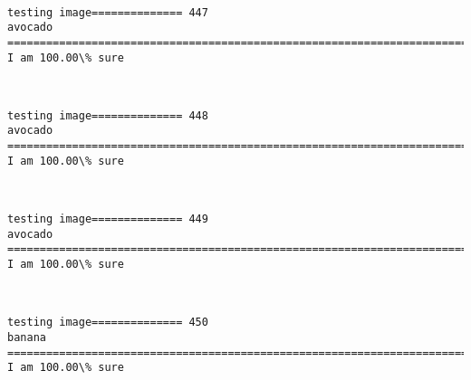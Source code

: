 \documentclass[11pt]{article}
\begin{document}
    \begin{center}
    \end{center}
    { \hspace*{\fill} \\}
    
    \begin{Verbatim}[commandchars=\\\{\}]
testing image============== 447
avocado
============================================================================
I am 100.00\% sure

    \end{Verbatim}

    \begin{center}
    \end{center}
    { \hspace*{\fill} \\}
    
    \begin{Verbatim}[commandchars=\\\{\}]
testing image============== 448
avocado
============================================================================
I am 100.00\% sure

    \end{Verbatim}

    \begin{center}
    \end{center}
    { \hspace*{\fill} \\}
    
    \begin{Verbatim}[commandchars=\\\{\}]
testing image============== 449
avocado
============================================================================
I am 100.00\% sure

    \end{Verbatim}

    \begin{center}
    \end{center}
    { \hspace*{\fill} \\}
    
    \begin{Verbatim}[commandchars=\\\{\}]
testing image============== 450
banana
============================================================================
I am 100.00\% sure

    \end{Verbatim}
\end{document}
